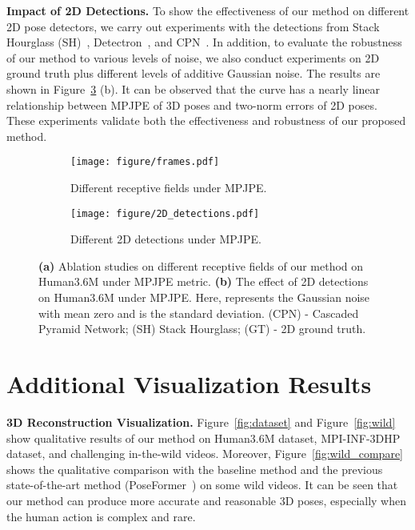 \documentclass[10pt,twocolumn,letterpaper]{article}
\def\VspaceL{\vspace{-0.40cm}}
\begin{document}
\noindent
\textbf{Impact of 2D Detections.}
To show the effectiveness of our method on different 2D pose detectors, we carry out experiments with the detections from Stack Hourglass (SH)~\cite{newell2016stacked}, Detectron~\cite{pavllo20193d}, and CPN~\cite{chen2018cascaded}. 
In addition, to evaluate the robustness of our method to various levels of noise, we also conduct experiments on 2D ground truth plus different levels of additive Gaussian noise. 
The results are shown in Figure~\ref{fig:frames and 2D} (b). 
It can be observed that the curve has a nearly linear relationship between MPJPE of 3D poses and two-norm errors of 2D poses. 
These experiments validate both the effectiveness and robustness of our proposed method. 

\begin{figure}[htb]
   \centering
   \begin{subfigure}[htb]{0.497\textwidth}
      \texttt{[image: figure/frames.pdf]}
      \caption{Different receptive fields under MPJPE.}
      \label{fig:frames}
   \end{subfigure}
   \begin{subfigure}[htb]{0.497\textwidth}
      \texttt{[image: figure/2D\_detections.pdf]}
      \caption{Different 2D detections under MPJPE.}
      \label{fig:2D_detections}
   \end{subfigure}
   \caption
   {
   \textbf{(a)} Ablation studies on different receptive fields of our method on Human3.6M under MPJPE metric. 
   \textbf{(b)} The effect of 2D detections on Human3.6M under MPJPE. 
   Here,  represents the Gaussian noise with mean zero and  is the standard deviation. 
   (CPN) - Cascaded Pyramid Network; (SH) Stack Hourglass; (GT) - 2D ground truth.  
   }
   \label{fig:frames and 2D}
   \VspaceL
\end{figure}

\section{Additional Visualization Results}
\noindent \textbf{3D Reconstruction Visualization.}
Figure~\ref{fig:dataset} and Figure~\ref{fig:wild} show qualitative results of our method on Human3.6M dataset, MPI-INF-3DHP dataset, and challenging in-the-wild videos. 
Moreover, Figure~\ref{fig:wild_compare} shows the qualitative comparison with the baseline method and the previous state-of-the-art method (PoseFormer~\cite{poseformer}) on some wild videos. 
It can be seen that our method can produce more accurate and reasonable 3D poses, especially when the human action is complex and rare. 
\end{document}
